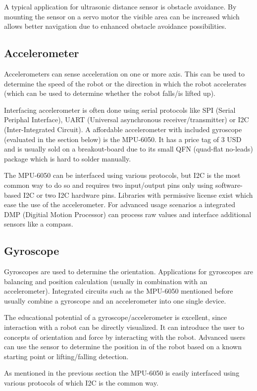 \documentclass[11pt,a4paper]{article}
\begin{document}
A typical application for ultrasonic distance sensor is obstacle avoidance. By mounting the sensor on a servo motor the visible area can be increased which allows better navigation due to enhanced obstacle avoidance possibilities. 

\subsection{Accelerometer}
Accelerometers can sense acceleration on one or more axis. This can be used to determine the speed of the robot or the direction in which the robot accelerates (which can be used to determine whether the robot falls/is lifted up). 

Interfacing accelerometer is often done using serial protocols like SPI (Serial Periphal Interface), UART (Universal asynchronous receiver/transmitter) or I2C (Inter-Integrated Circuit). A affordable accelerometer with included gyroscope (evaluated in the section below) is the MPU-6050. It has a price tag of 3 USD and is usually sold on a breakout-board due to its small QFN (quad-flat no-leads) package which is hard to solder manually. 

The MPU-6050 can be interfaced using various protocols, but I2C is the most common way to do so and requires two input/output pins only using software-based I2C or two I2C hardware pins. Libraries with permissive license exist which ease the use of the accelerometer. For advanced usage scenarios a integrated DMP (Digitial Motion Processor) can process raw values and interface additional sensors like a compass.
\subsection{Gyroscope}
Gyroscopes are used to determine the orientation. Applications for gyroscopes are balancing and position calculation (usually in combination with an accelerometer). Integrated circuits such as the MPU-6050 mentioned before usually combine a gyroscope and an accelerometer into one single device.

The educational potential of a gyroscope/accelerometer is excellent, since interaction with a robot can be directly visualized. It can introduce the user to concepts of orientation and force by interacting with the robot. Advanced users can use the sensor to determine the position in of the robot based on a known starting point or lifting/falling detection.

As mentioned in the previous section the MPU-6050 is easily interfaced using various protocols of which I2C is the common way.
\end{document}
